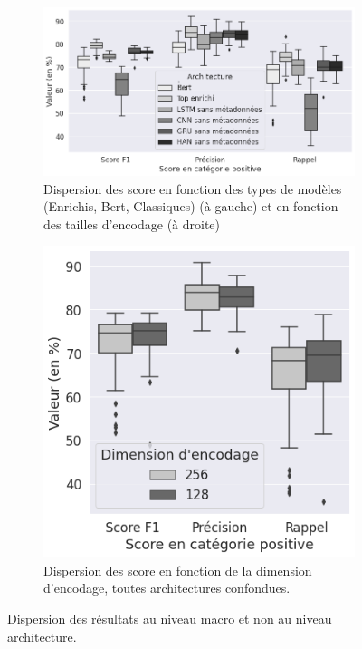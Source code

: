 \begin{figure}[ht]
        \begin{subfigure}{0.65\textwidth}
            \centering
            \includegraphics[width=\linewidth]{figures/chap4/main-lineartop5vstheworld.png}
            \caption{Dispersion des score en fonction des types de modèles (Enrichis, Bert, Classiques) (à gauche) et en fonction des tailles d'encodage (à droite)}
            \label{fig:chap4:main-results-dispersion-encoder}
        \end{subfigure} \hfill %
        \begin{subfigure}{0.30\linewidth}%
            \centering
            \includegraphics[width=\linewidth]{figures/chap4/main-encodingdimension.png}
            \caption{Dispersion des score en fonction de la dimension d'encodage, toutes architectures confondues.}
            \label{fig:chap4:main-results-dispersion-dimension}
        \end{subfigure}
        \caption{Dispersion des résultats au niveau macro et non au niveau architecture.}
\end{figure}%
    \clearpage

